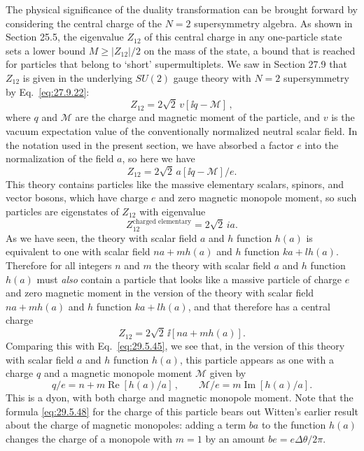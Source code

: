 The physical significance of the duality transformation can be brought
forward by considering the central charge of the \(N=2\) supersymmetry
algebra. As shown in Section 25.5, the eigenvalue \(Z_{12}\) of this central
charge in any one-particle state sets a lower bound
\(M\geq\lvert Z_{12}\rvert/2\) on the mass of the state, a bound that is
reached for particles that belong to `short' supermultiplets. We saw in
Section 27.9 that \(Z_{12}\) is given in the underlying \(SU(2)\) gauge
theory with \(N=2\) supersymmetry by Eq.~\eqref{eq:27.9.22}:
\[
  Z_{12}=2\sqrt{2}\,v[\ii q-\mathcal{M}]\,,
\]
where \(q\) and \(\mathcal{M}\) are the charge and magnetic moment of the
particle, and \(v\) is the vacuum expectation value of the conventionally
normalized neutral scalar field. In the notation used in the present
section, we have absorbed a factor \(e\) into the normalization of the field
\(a\), so here we have
\begin{equation}
  Z_{12}=2\sqrt{2}\,a[\ii q-\mathcal{M}]/e.
  \tag{29.5.45}\label{eq:29.5.45}
\end{equation}
This theory contains particles like the massive elementary scalars, spinors,
and vector bosons, which have charge \(e\) and zero magnetic monopole moment,
so such particles are eigenstates of \(Z_{12}\) with eigenvalue
\begin{equation}
  Z_{12}^{\text{charged elementary}}=2\sqrt{2}\,ia.
  \tag{29.5.46}\label{eq:29.5.46}
\end{equation}
As we have seen, the theory with scalar field \(a\) and \(h\) function
\(h(a)\) is equivalent to one with scalar field \(na+mh(a)\) and \(h\)
function \(ka+lh(a)\). Therefore for all integers \(n\) and \(m\) the theory
with scalar field \(a\) and \(h\) function \(h(a)\) must \textit{also}
contain a particle that looks like a massive particle of charge \(e\) and
zero magnetic moment in the version of the theory with scalar field
\(na+mh(a)\) and \(h\) function \(ka+lh(a)\), and that therefore has a
central charge
\begin{equation}
  Z_{12}=2\sqrt{2}\,\ii[na+mh(a)].
  \tag{29.5.47}\label{eq:29.5.47}
\end{equation}
Comparing this with Eq.~\eqref{eq:29.5.45}, we see that, in the version of
this theory with scalar field \(a\) and \(h\) function \(h(a)\), this
particle appears as one with a charge \(q\) and a magnetic monopole moment
\(\mathcal{M}\) given by
\begin{equation}
  q/e=n+m\operatorname{Re}[h(a)/a]\,,
  \qquad
  \mathcal{M}/e=m\operatorname{Im}[h(a)/a].
  \tag{29.5.48}\label{eq:29.5.48}
\end{equation}
This is a dyon, with both charge and magnetic monopole moment. Note that the
formula \eqref{eq:29.5.48} for the charge of this particle bears out Witten's
earlier result about the charge of magnetic monopoles: adding a term \(ba\)
to the function \(h(a)\) changes the charge of a monopole with \(m=1\) by an
amount \(be=e\Delta\theta/2\pi\).


